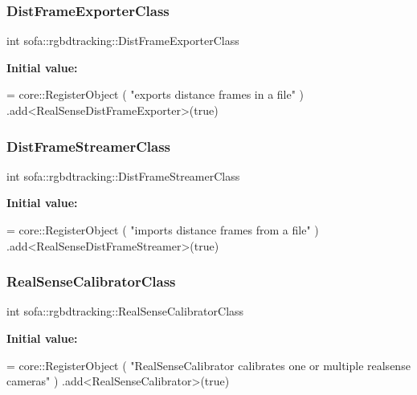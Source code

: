 \subsubsection{\texorpdfstring{Dist\+Frame\+Exporter\+Class}{DistFrameExporterClass}}
{\footnotesize\ttfamily int sofa\+::rgbdtracking\+::\+Dist\+Frame\+Exporter\+Class}

{\bfseries Initial value\+:}
\begin{DoxyCode}
= core::RegisterObject ( \textcolor{stringliteral}{"exports distance frames in a file"} )
        .add<RealSenseDistFrameExporter>(\textcolor{keyword}{true})
\end{DoxyCode}
\mbox{\label{namespacesofa_1_1rgbdtracking_a7d552ae238bb3e3f0323220bd43f38d5}} 
\subsubsection{\texorpdfstring{Dist\+Frame\+Streamer\+Class}{DistFrameStreamerClass}}
{\footnotesize\ttfamily int sofa\+::rgbdtracking\+::\+Dist\+Frame\+Streamer\+Class}

{\bfseries Initial value\+:}
\begin{DoxyCode}
= core::RegisterObject ( \textcolor{stringliteral}{"imports distance frames from a file"} )
        .add<RealSenseDistFrameStreamer>(\textcolor{keyword}{true})
\end{DoxyCode}
\mbox{\label{namespacesofa_1_1rgbdtracking_a5a0fbb78b29abf28ac16247f111a57f6}} 
\subsubsection{\texorpdfstring{Real\+Sense\+Calibrator\+Class}{RealSenseCalibratorClass}}
{\footnotesize\ttfamily int sofa\+::rgbdtracking\+::\+Real\+Sense\+Calibrator\+Class}

{\bfseries Initial value\+:}
\begin{DoxyCode}
= core::RegisterObject ( \textcolor{stringliteral}{"RealSenseCalibrator calibrates one or multiple realsense cameras"} )
        .add<RealSenseCalibrator>(\textcolor{keyword}{true})
\end{DoxyCode}
\mbox{\label{namespacesofa_1_1rgbdtracking_a2430eec90f6511f570bb58f6ce29e745}} 
